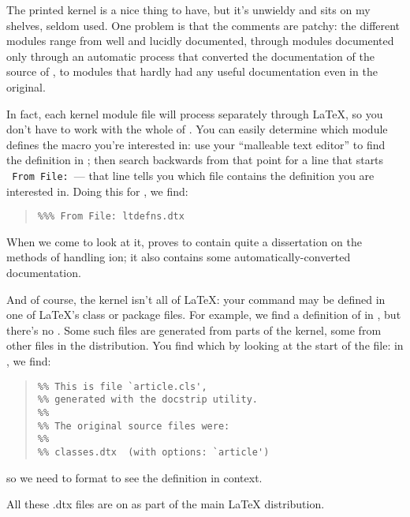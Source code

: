 The printed kernel is a nice thing to have, but it's unwieldy and sits
on my shelves, seldom used.  One problem is that the comments are
patchy: the different modules range from well and lucidly documented,
through modules documented only through an automatic process that
converted the documentation of the source of \LaTeXo{}, to modules
that hardly had any useful documentation even in the \LaTeXo{} original.

In fact, each kernel module  file will process separately
through \LaTeX{}, so you don't have to work with the whole of
.  You can easily determine which module defines the
macro you're interested in: use your ``malleable text editor'' to find
the definition in ; then search backwards from that
point for a line that starts %
\texttt{\textpercent{}\textpercent{}\textpercent{}\ From File:}~--- that line
tells you which  file contains the definition you are interested
in.  Doing this for , we find:
\begin{quote}
\begin{verbatim}
%%% From File: ltdefns.dtx
\end{verbatim}
\end{quote}
When we come to look at it,  proves to contain
quite a dissertation on the methods of handling ion; it
also contains some automatically-converted \LaTeXo{} documentation.

And of course, the kernel isn't all of \LaTeX{}: your command may be
defined in one of \LaTeX{}'s class or package files.  For example, we
find a definition of  in , but
there's no .  Some such files are generated from
parts of the kernel, some from other files in the distribution.  You
find which by looking at the start of the file: in ,
we find:
\begin{quote}
\begin{verbatim}
%% This is file `article.cls',
%% generated with the docstrip utility.
%%
%% The original source files were:
%%
%% classes.dtx  (with options: `article')
\end{verbatim}
\end{quote}
so we need to format  to see the definition in
context.

All these .dtx files are on  as part of the main \LaTeX{}
distribution.
\begin{ctanrefs}
\item[\nothtml{\rmfamily}\LaTeX{} distribution]
\item[texdef,\nothtml{\rmfamily aka} latexdef]
\end{ctanrefs}

